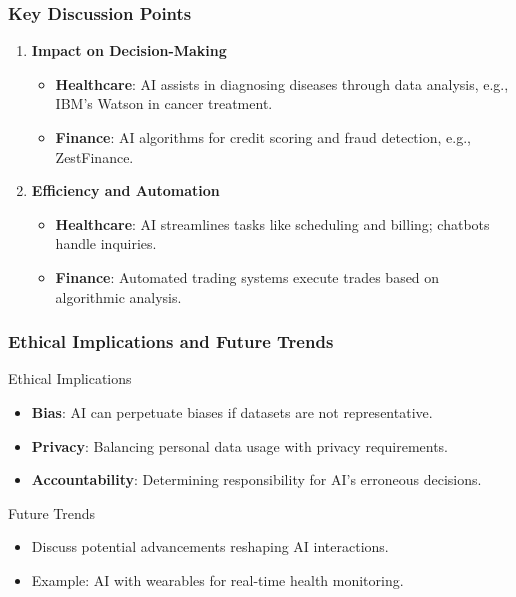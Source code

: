\documentclass[aspectratio=169]{beamer}
\begin{document}
\begin{frame}[fragile]
    \frametitle{Key Discussion Points}
    
    \begin{enumerate}
        \item \textbf{Impact on Decision-Making}
        \begin{itemize}
            \item \textbf{Healthcare}: AI assists in diagnosing diseases through data analysis, e.g., IBM's Watson in cancer treatment.
            \item \textbf{Finance}: AI algorithms for credit scoring and fraud detection, e.g., ZestFinance.
        \end{itemize}

        \item \textbf{Efficiency and Automation}
        \begin{itemize}
            \item \textbf{Healthcare}: AI streamlines tasks like scheduling and billing; chatbots handle inquiries.
            \item \textbf{Finance}: Automated trading systems execute trades based on algorithmic analysis.
        \end{itemize}
    \end{enumerate}
\end{frame}

\begin{frame}[fragile]
    \frametitle{Ethical Implications and Future Trends}
    
    \begin{block}{Ethical Implications}
        \begin{itemize}
            \item \textbf{Bias}: AI can perpetuate biases if datasets are not representative.
            \item \textbf{Privacy}: Balancing personal data usage with privacy requirements.
            \item \textbf{Accountability}: Determining responsibility for AI's erroneous decisions.
        \end{itemize}
    \end{block}

    \begin{block}{Future Trends}
        \begin{itemize}
            \item Discuss potential advancements reshaping AI interactions.
            \item Example: AI with wearables for real-time health monitoring.
        \end{itemize}
    \end{block}
\end{frame}
\end{document}
